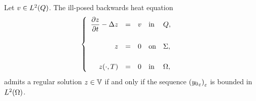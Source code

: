 \begin{theoreme}\label{thm:controllability-result-5}%
    Let $v\in L^{2}\!\left({Q}\right)$. The ill-posed backwards heat equation
    \begin{equation}\label{eq:initial-problem-2}
        \begin{cases}\displaystyle
            \begin{array}{rclll}
                \dfrac{\partial{}z}{\partial{}t} - \Delta z & = & v & \text{in} & Q,\\
                \\
                z & = & 0 & \text{on} & \Sigma,\\
                \\
                z(\cdot,T) & = & 0 & \text{in} & \Omega,
            \end{array}
        \end{cases}
    \end{equation}
    admits a regular solution $z\in \mathbb{V}$ if and only if the sequence
    $\displaystyle {\left({{y_{0}}_{\varepsilon}}\right)}_{\varepsilon}$ is bounded in
    $L^{2}\!\left({\Omega}\right)$.
\end{theoreme}

